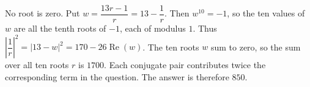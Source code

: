 No root is zero. Put $w=\dfrac{13r-1}{r}=13-\dfrac{1}{r}$. Then $w^{10}=-1$, so the ten values of $w$ are all the tenth roots of $-1$, each of modulus $1$. Thus $|\dfrac{1}{r}|^2=|13-w|^2=170-26\operatorname{Re}(w)$. The ten roots $w$ sum to zero, so the sum over all ten roots $r$ is $1700$. Each conjugate pair contributes twice the corresponding term in the question. The answer is therefore $\boxed{850}$.
